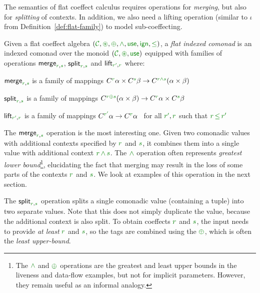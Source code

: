 The semantics of flat coeffect calculus requires operations for \emph{merging}, but also for
\emph{splitting} of contexts. In addition, we also need a lifting operation (similar to $\iota$ 
from Definition~\ref{def:flat-family}) to model sub-coeffecting.

\begin{definition}
Given a flat coeffect algebra $(\C, \cseq, \cpar, \czip, \cunit, \czero, \cleq)$,
a \emph{flat indexed comonad} is an indexed comonad over the monoid $(\C, \cseq, \cunit)$
equipped with families of operations $\ident{merge}_{\cclrd{r},\cclrd{s}}$, $\ident{split}_{\cclrd{r},\cclrd{s}}$ 
and $\ident{lift}_{\cclrd{r'},\cclrd{r}}$ where:
%
\begin{compactitem}
\item $\ident{merge}_{\cclrd{r},\cclrd{s}}$ is a family of mappings
  $\ctyp{\cclrd{r}}{\alpha} \times \ctyp{\cclrd{s}}{\beta} \rightarrow \ctyp{\cclrd{r}\czip\cclrd{s}}{(\alpha \times \beta)}$
\item $\ident{split}_{\cclrd{r},\cclrd{s}}$ is a family of mappings
  $\ctyp{\cclrd{r}\cpar\cclrd{s}}{(\alpha \times \beta)} \rightarrow \ctyp{\cclrd{r}}{\alpha} \times \ctyp{\cclrd{s}}{\beta}$
\item $\ident{lift}_{\cclrd{r'},\cclrd{r}}$ is a family of mappings
  $\ctyp{\cclrd{r'}}{\alpha} \rightarrow \ctyp{\cclrd{r}}{\alpha}$~ for all $\cclrd{r'}, \cclrd{r}$ such that $\cclrd{r}\,\cleq\,\cclrd{r'}$
\end{compactitem}
\end{definition}

\noindent
The $\ident{merge}_{\cclrd{r},\cclrd{s}}$ operation is the most interesting one. Given two comonadic
values with additional contexts specified by $\cclrd{r}$ and $\cclrd{s}$, it combines them into a 
single value with additional context $\cclrd{r}\,\czip\,\cclrd{s}$. The $\czip$ operation often represents
\emph{greatest lower bound}\footnote{The $\czip$ and $\cpar$ operations are the greatest and least upper 
bounds in the liveness and data-flow examples, but not for implicit parameters. However, they remain useful 
as an informal analogy.}, elucidating the fact that merging may result in the loss of some parts of 
the contexts $\cclrd{r}$ and $\cclrd{s}$. We look at examples of this operation in the next section.

The $\ident{split}_{\cclrd{r},\cclrd{s}}$ operation splits a single comonadic value (containing a tuple)
into two separate values. Note that this does not simply duplicate the value, because the additional
context is also split. To obtain coeffects $\cclrd{r}$ and $\cclrd{s}$, the input needs to provide 
\emph{at least} $\cclrd{r}$ and $\cclrd{s}$, so the tags are combined using the $\cpar$, which is often 
the \emph{least upper-bound}\footnotemark[1].

